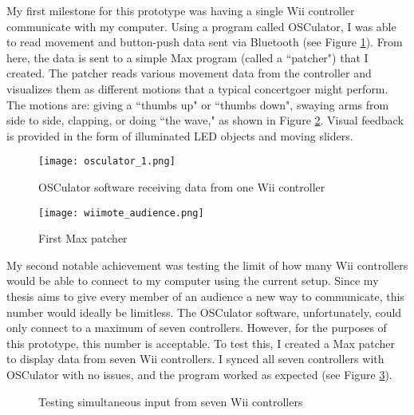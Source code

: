 My first milestone for this prototype was having a single Wii controller communicate with my computer. Using a program called OSCulator, I was able to read movement and button-push data sent via Bluetooth (see Figure \ref{prototyping1}). From here, the data is sent to a simple Max program (called a ``patcher") that I created. The patcher reads various movement data from the controller and visualizes them as different motions that a typical concertgoer might perform. The motions are: giving a ``thumbs up" or ``thumbs down", swaying arms from side to side, clapping, or doing ``the wave," as shown in Figure \ref{prototyping2}. Visual feedback is provided in the form of illuminated LED objects and moving sliders.

\begin{figure}[t]
	\centering

	\texttt{[image: osculator\_1.png]}
	\caption{OSCulator software receiving data from one Wii controller}

	\label{prototyping1}
\end{figure}

\begin{figure}[t]
	\centering

	\texttt{[image: wiimote\_audience.png]}
	\caption{First Max patcher}

	\label{prototyping2}
\end{figure}

My second notable achievement was testing the limit of how many Wii controllers would be able to connect to my computer using the current setup. Since my thesis aims to give every member of an audience a new way to communicate, this number would ideally be limitless. The OSCulator software, unfortunately, could only connect to a maximum of seven controllers. However, for the purposes of this prototype, this number is acceptable. To test this, I created a Max patcher to display data from seven Wii controllers. I synced all seven controllers with OSCulator with no issues, and the program worked as expected (see Figure \ref{prototyping3}).

\begin{figure}[t]
	\centering

	\hspace{0.1cm}
	\caption{Testing simultaneous input from seven Wii controllers}

	\label{prototyping3}
\end{figure}

